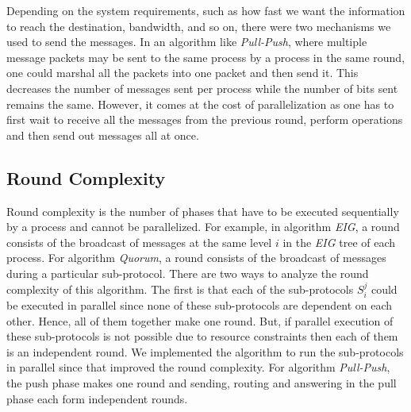    Depending on the system requirements, such as how fast we want the information to reach the destination, bandwidth, and so on, there were two mechanisms we used to send the messages. In an algorithm like \textit{Pull-Push}, where multiple message packets may be sent to the same process by a process in the same round, one could marshal all the packets into one packet and then send it. This decreases the number of messages sent per process while the number of bits sent remains the same. However, it comes at the cost of parallelization as one has to first wait to receive all the messages from the previous round, perform operations and then send out messages all at once. 


\subsection{Round Complexity}
Round complexity is the number of phases that have to be executed sequentially by a process and cannot be parallelized. For example, in algorithm \textit{EIG}, a round consists of the broadcast of messages at the same level $i$ in the \textit{EIG} tree of each process. For algorithm \textit{Quorum}, a round consists of the broadcast of messages during a particular sub-protocol. There are two ways to analyze the round complexity of this algorithm. The first is that each of the sub-protocols $S_i^j$ could be executed in parallel since none of these sub-protocols are dependent on each other. Hence, all of them together make one round. But, if parallel execution of these sub-protocols is not possible due to resource constraints then each of them is an independent round. We implemented the algorithm to run the sub-protocols in parallel since that improved the round complexity. For algorithm \textit{Pull-Push}, the push phase makes one round and sending, routing and answering in the pull phase each form independent rounds.

